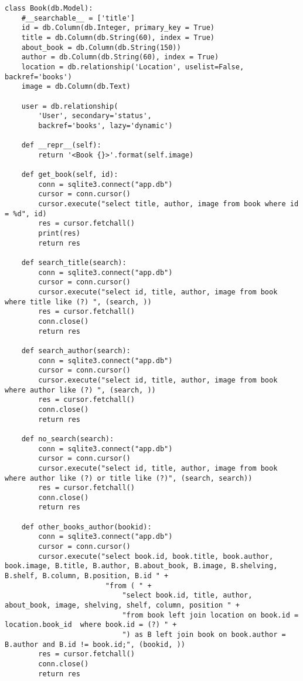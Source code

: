 \begin{lstlisting}[label=some-code, caption=Класс <<Книги>>]
class Book(db.Model):
    #__searchable__ = ['title']
    id = db.Column(db.Integer, primary_key = True)
    title = db.Column(db.String(60), index = True)
    about_book = db.Column(db.String(150))
    author = db.Column(db.String(60), index = True)
    location = db.relationship('Location', uselist=False, backref='books')
    image = db.Column(db.Text)

    user = db.relationship(
        'User', secondary='status',
        backref='books', lazy='dynamic')

    def __repr__(self):
        return '<Book {}>'.format(self.image)

    def get_book(self, id):
        conn = sqlite3.connect("app.db")
        cursor = conn.cursor()
        cursor.execute("select title, author, image from book where id = %d", id)
        res = cursor.fetchall()
        print(res)
        return res

    def search_title(search):
        conn = sqlite3.connect("app.db")
        cursor = conn.cursor()
        cursor.execute("select id, title, author, image from book where title like (?) ", (search, ))
        res = cursor.fetchall()
        conn.close()
        return res

    def search_author(search):
        conn = sqlite3.connect("app.db")
        cursor = conn.cursor()
        cursor.execute("select id, title, author, image from book where author like (?) ", (search, ))
        res = cursor.fetchall()
        conn.close()
        return res

    def no_search(search):
        conn = sqlite3.connect("app.db")
        cursor = conn.cursor()
        cursor.execute("select id, title, author, image from book where author like (?) or title like (?)", (search, search))
        res = cursor.fetchall()
        conn.close()
        return res

    def other_books_author(bookid):
        conn = sqlite3.connect("app.db")
        cursor = conn.cursor()
        cursor.execute("select book.id, book.title, book.author, book.image, B.title, B.author, B.about_book, B.image, B.shelving, B.shelf, B.column, B.position, B.id " +
                        "from ( " +
                            "select book.id, title, author, about_book, image, shelving, shelf, column, position " +
                            "from book left join location on book.id = location.book_id  where book.id = (?) " +
                            ") as B left join book on book.author = B.author and B.id != book.id;", (bookid, ))
        res = cursor.fetchall()
        conn.close()
        return res


\end{lstlisting}
